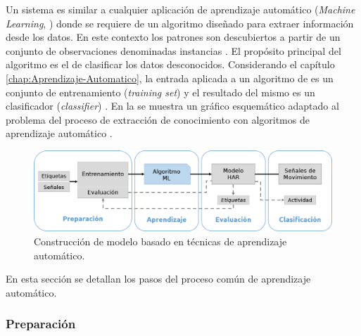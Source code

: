 \label{sec45:clasificador}Un sistema  es similar a cualquier
aplicación de aprendizaje automático (\emph{Machine Learning}, )
donde se requiere de un algoritmo diseñado para extraer información
desde los datos. En este contexto los patrones son descubiertos a
partir de un conjunto de observaciones denominadas instancias \cite{LaraLabrador2013}.
El propósito principal del algoritmo es el de clasificar los datos
desconocidos. Considerando el capítulo \ref{chap:Aprendizaje-Automatico},
la entrada aplicada a un algoritmo de  es un conjunto de
entrenamiento (\emph{training set}) y el resultado del mismo es un
clasificador (\emph{classifier}) \cite{Rajaraman2011}. En la 
se muestra un gráfico esquemático adaptado al problema 
del proceso de extracción de conocimiento con algoritmos de aprendizaje
automático \cite{Raschka2014}.

\begin{figure}[H]
\begin{centering}
\includegraphics[width=1\columnwidth]{capitulo-4/graphics/clasificacion}
\par\end{centering}
\caption[Modelo de aprendizaje automático]{\label{fig4:clasificador}Construcción de modelo  basado
en técnicas de aprendizaje automático.}
\end{figure}

En esta sección se detallan los pasos del proceso común de aprendizaje
automático.

\subsubsection{Preparación}

